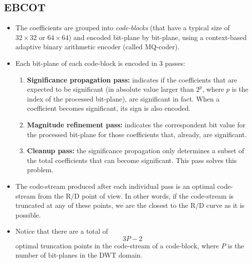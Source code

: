 \newpage
\subsection*{EBCOT~\cite{2002.taubman}}
\begin{itemize}
\item The coefficients are grouped into \textit{code-blocks} (that
  have a typical size of $32\times 32$ or $64\times 64$) and encoded
  bit-plane by bit-plane, using a context-based adaptive binary
  arithmetic encoder (called MQ-coder).
  \begin{center}
  \end{center}
\newpage
\item Each bit-plane of each code-block is encoded in 3 passes:
\begin{enumerate}
\item \textbf{Significance propagation pass:} indicates if the
  coefficients that are expected to be significant (in absolute value
  larger than $2^p$, where $p$ is the index of the processed
  bit-plane), are significant in fact. When a coefficient becomes
  significant, its sign is also encoded.
\item \textbf{Magnitude refinement pass:} indicates the correspondent
  bit value for the processed bit-plane for those coefficients that,
  already, are significant.
\item \textbf{Cleanup pass:} the significance propagation only
  determines a subset of the total coefficients that can become
  significant. This pass solves this problem.
\end{enumerate}

\item The code-stream produced after each individual pass is an
  optimal code-stream from the R/D point of view. In other words, if
  the code-stream is truncated at any of these points, we are the
  closest to the R/D curve as it is possible.
\end{itemize}
\begin{center}
\end{center}

\begin{itemize}
\item Notice that there are a total of
  \begin{equation}
    3P-2
  \end{equation}
  optimal truncation points in the code-stream of a code-block, where
  $P$ is the number of bit-planes in the DWT domain.
\end{itemize}

